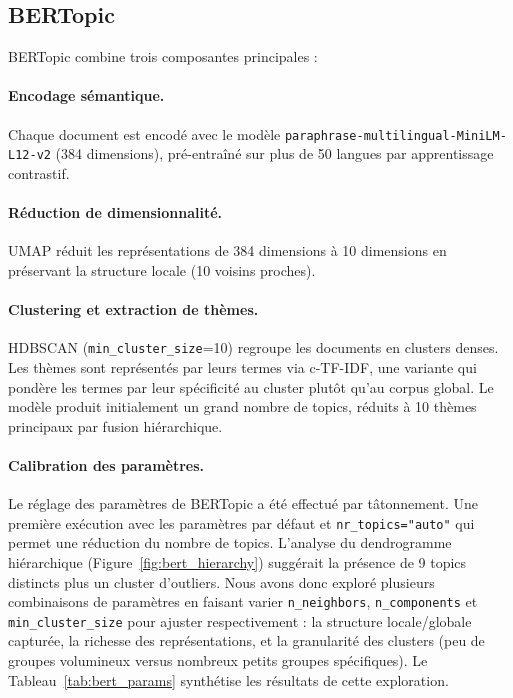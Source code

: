 \documentclass{article}
\begin{document}
\subsection{BERTopic}
BERTopic combine trois composantes principales :

\paragraph{Encodage sémantique.}
Chaque document est encodé avec le modèle \texttt{paraphrase-multilingual-MiniLM-L12-v2} (384 dimensions), pré-entraîné sur plus de 50 langues par apprentissage contrastif.

\paragraph{Réduction de dimensionnalité.}
UMAP réduit les représentations de 384 dimensions à 10 dimensions en préservant la structure locale (10 voisins proches).

\paragraph{Clustering et extraction de thèmes.}
HDBSCAN (\texttt{min\_cluster\_size}=10) regroupe les documents en clusters denses. Les thèmes sont représentés par leurs termes via c-TF-IDF, une variante qui pondère les termes par leur spécificité au cluster plutôt qu'au corpus global. Le modèle produit initialement un grand nombre de topics, réduits à 10 thèmes principaux par fusion hiérarchique.

\paragraph{Calibration des paramètres.}
Le réglage des paramètres de BERTopic a été effectué par tâtonnement. Une première exécution avec les paramètres par défaut et \texttt{nr\_topics="auto"} qui permet une réduction du nombre de topics. L'analyse du dendrogramme hiérarchique (Figure~\ref{fig:bert_hierarchy}) suggérait la présence de 9 topics distincts plus un cluster d'outliers. Nous avons donc exploré plusieurs combinaisons de paramètres en faisant varier \texttt{n\_neighbors}, \texttt{n\_components} et \texttt{min\_cluster\_size} pour ajuster respectivement : la structure locale/globale capturée, la richesse des représentations, et la granularité des clusters (peu de groupes volumineux versus nombreux petits groupes spécifiques). Le Tableau~\ref{tab:bert_params} synthétise les résultats de cette exploration.
\end{document}
